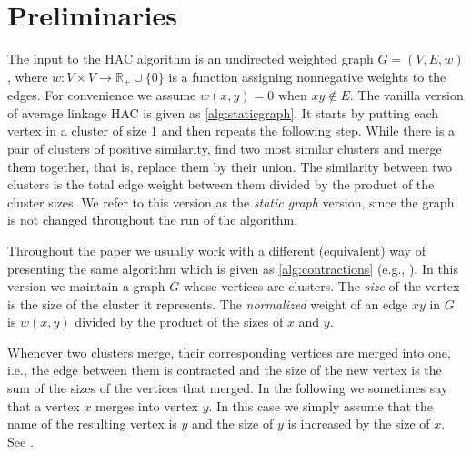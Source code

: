 \documentclass[11pt]{article}
\begin{document}
\section{Preliminaries}\label{sec:prelims}
The input to the HAC algorithm is an undirected weighted graph $G=(V, E, w)$, where $w : V \times V \rightarrow \mathbb{R}_+ \cup \{0\}$ is a function assigning nonnegative weights to the edges.
For convenience we assume $w(x, y) = 0$ when $xy \not\in E$.
The vanilla version of average linkage HAC is given as \cref{alg:staticgraph}.
It starts by putting each vertex in a cluster of size $1$ and then repeats the following step.
While there is a pair of clusters of positive similarity, find two most similar clusters and merge them together, that is, replace them by their union.
The similarity between two clusters is the total edge weight between them divided by the product of the cluster sizes.
We refer to this version as the \emph{static graph} version, since the graph is not changed throughout the run of the algorithm.

Throughout the paper we usually work with a different (equivalent) way of presenting the same algorithm which is given as \cref{alg:contractions} (e.g., ).
In this version we maintain a graph $G$ whose vertices are clusters.
The \emph{size} of the vertex is the size of the cluster it represents.
The \emph{normalized} weight of an edge $xy$ in $G$ is $w(x,y)$ divided by the product of the sizes of $x$ and $y$.

Whenever two clusters merge, their corresponding vertices are merged into one, i.e., the edge between them is contracted and the size of the new vertex is the sum of the sizes of the vertices that merged.
In the following we sometimes say that a vertex $x$ merges into vertex $y$.
In this case we simply assume that the name of the resulting vertex is $y$ and the size of $y$ is increased by the size of $x$. See .
\end{document}
